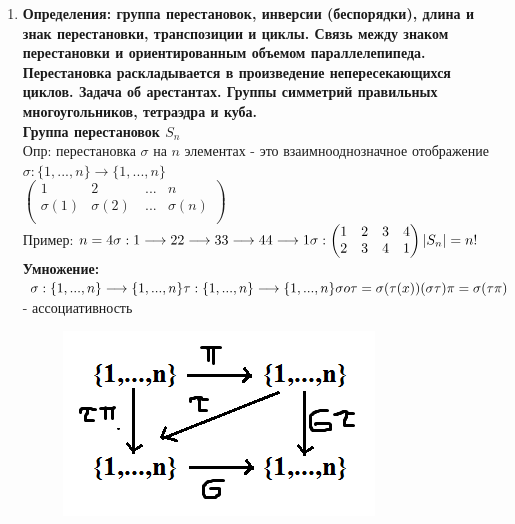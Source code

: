 \documentclass[12pt, oneside]{book}
\theoremstyle{definition}
\begin{document}
\begin{enumerate}
\item \textbf{Определения: группа перестановок, инверсии (беспорядки), длина и знак перестановки, транспозиции и циклы. Связь между знаком перестановки и ориентированным объемом параллелепипеда. Перестановка раскладывается в произведение непересекающихся циклов. Задача об арестантах. Группы симметрий правильных многоугольников, тетраэдра и куба.}\\
\textbf{Группа перестановок $S_n$}\\
Опр: перестановка $\sigma$ на $n$ элементах - это взаимнооднозначное отображение $\sigma: \{1,...,n\} \longrightarrow \{1,...,n\}$\\
$\begin{pmatrix}
1 & 2 & ... & n \\
\sigma (1) & \sigma (2)\ & ... & \sigma (n)\\
\end{pmatrix}$\\
Пример: $n = 4\\
\sigma: 1\longrightarrow 2\\
2\longrightarrow 3\\
3 \longrightarrow 4\\
4\longrightarrow 1\\
\sigma: \begin{pmatrix}
1 & 2 & 3 & 4\\
2 & 3 & 4 & 1\\
\end{pmatrix}\\
|S_n| = n!$\\
\textbf{Умножение:} $\sigma: \{1,...,n\} \longrightarrow \{1,...,n\}\\
\tau: \{1,...,n\} \longrightarrow \{1,...,n\}\\
\sigma o \tau = \sigma (\tau (x))\\
(\sigma \tau)\pi = \sigma (\tau \pi)$ - ассоциативность \\
\begin{figure}[h!]
\centering
\includegraphics[scale=0.6]{4-1.PNG}

\end{figure}
\end{enumerate}
\end{document}
